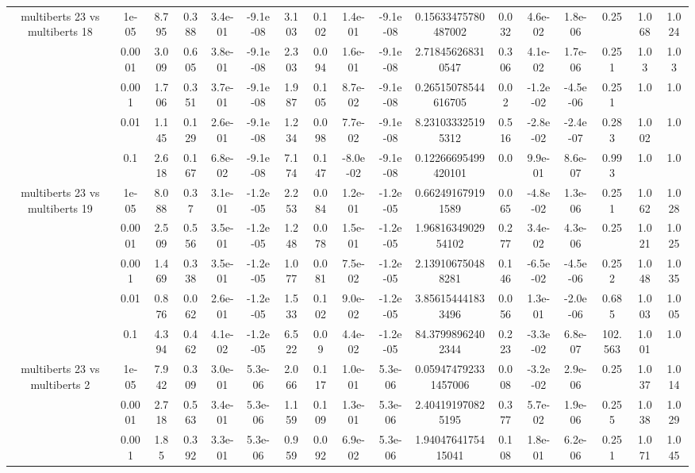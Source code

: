 \begin{tabular}{|c|c|c|c|c|c|c|c|c|c|c|c|c|c|c|c|c|}
\hline
\multirow{5}{*}{multiberts 23 vs multiberts 18} & 1e-05 & 8.795 & 0.388 & 3.4e-01 & -9.1e-08 & 3.103 & 0.102 & 1.4e-01 & -9.1e-08 & 0.15633475780487002 & 0.032 & 4.6e-02 & 1.8e-06 & 0.25 & 1.068 & 1.024 \\
 & 0.0001 & 3.009 & 0.605 & 3.8e-01 & -9.1e-08 & 2.303 & 0.094 & 1.6e-01 & -9.1e-08 & 2.718456268310547 & 0.306 & 4.1e-02 & 1.7e-06 & 0.251 & 1.03 & 1.03 \\
 & 0.001 & 1.706 & 0.351 & 3.7e-01 & -9.1e-08 & 1.987 & 0.105 & 8.7e-02 & -9.1e-08 & 0.26515078544616705 & 0.02 & -1.2e-02 & -4.5e-06 & 0.251 & 1.0 & 1.0 \\
 & 0.01 & 1.145 & 0.129 & 2.6e-01 & -9.1e-08 & 1.234 & 0.098 & 7.7e-02 & -9.1e-08 & 8.231033325195312 & 0.516 & -2.8e-02 & -2.4e-07 & 0.283 & 1.002 & 1.0 \\
 & 0.1 & 2.618 & 0.167 & 6.8e-02 & -9.1e-08 & 7.174 & 0.147 & -8.0e-02 & -9.1e-08 & 0.12266695499420101 & 0.0 & 9.9e-01 & 8.6e-07 & 0.993 & 1.0 & 1.0 \\
\hline
\multirow{5}{*}{multiberts 23 vs multiberts 19} & 1e-05 & 8.088 & 0.37 & 3.1e-01 & -1.2e-05 & 2.253 & 0.084 & 1.2e-01 & -1.2e-05 & 0.662491679191589 & 0.065 & -4.8e-02 & 1.3e-06 & 0.251 & 1.062 & 1.028 \\
 & 0.0001 & 2.509 & 0.556 & 3.5e-01 & -1.2e-05 & 1.248 & 0.078 & 1.5e-01 & -1.2e-05 & 1.9681634902954102 & 0.277 & 3.4e-02 & 4.3e-06 & 0.25 & 1.021 & 1.025 \\
 & 0.001 & 1.469 & 0.338 & 3.5e-01 & -1.2e-05 & 1.077 & 0.081 & 7.5e-02 & -1.2e-05 & 2.139106750488281 & 0.146 & -6.5e-02 & -4.5e-06 & 0.252 & 1.048 & 1.035 \\
 & 0.01 & 0.876 & 0.062 & 2.6e-01 & -1.2e-05 & 1.533 & 0.102 & 9.0e-02 & -1.2e-05 & 3.856154441833496 & 0.056 & 1.3e-01 & -2.0e-06 & 0.685 & 1.003 & 1.005 \\
 & 0.1 & 4.394 & 0.462 & 4.1e-02 & -1.2e-05 & 6.522 & 0.09 & 4.4e-02 & -1.2e-05 & 84.37998962402344 & 0.223 & -3.3e-02 & 6.8e-07 & 102.563 & 1.001 & 1.0 \\
\hline
\multirow{5}{*}{multiberts 23 vs multiberts 2} & 1e-05 & 7.942 & 0.309 & 3.0e-01 & 5.3e-06 & 2.066 & 0.117 & 1.0e-01 & 5.3e-06 & 0.059474792331457006 & 0.008 & -3.2e-02 & 2.9e-06 & 0.25 & 1.037 & 1.014 \\
 & 0.0001 & 2.718 & 0.563 & 3.4e-01 & 5.3e-06 & 1.159 & 0.109 & 1.3e-01 & 5.3e-06 & 2.404191970825195 & 0.377 & 5.7e-02 & 1.9e-06 & 0.255 & 1.038 & 1.029 \\
 & 0.001 & 1.85 & 0.392 & 3.3e-01 & 5.3e-06 & 0.959 & 0.092 & 6.9e-02 & 5.3e-06 & 1.9404764175415041 & 0.108 & 1.8e-01 & 6.2e-06 & 0.251 & 1.071 & 1.045 \\

\end{tabular}
